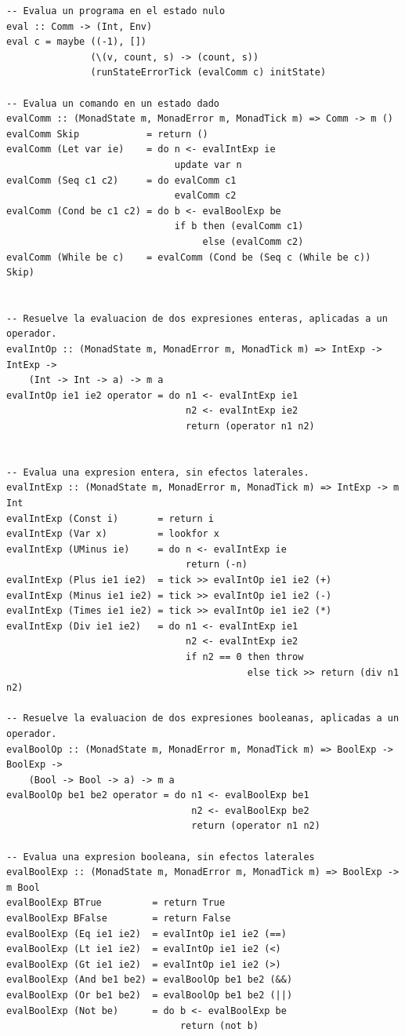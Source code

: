 \documentclass{article}
\begin{document}
\begin{lstlisting}
-- Evalua un programa en el estado nulo
eval :: Comm -> (Int, Env)
eval c = maybe ((-1), []) 
               (\(v, count, s) -> (count, s)) 
               (runStateErrorTick (evalComm c) initState)

-- Evalua un comando en un estado dado
evalComm :: (MonadState m, MonadError m, MonadTick m) => Comm -> m ()
evalComm Skip            = return ()
evalComm (Let var ie)    = do n <- evalIntExp ie 
                              update var n
evalComm (Seq c1 c2)     = do evalComm c1 
                              evalComm c2
evalComm (Cond be c1 c2) = do b <- evalBoolExp be 
                              if b then (evalComm c1)
                                   else (evalComm c2)
evalComm (While be c)    = evalComm (Cond be (Seq c (While be c)) Skip)


-- Resuelve la evaluacion de dos expresiones enteras, aplicadas a un operador.
evalIntOp :: (MonadState m, MonadError m, MonadTick m) => IntExp -> IntExp -> 
    (Int -> Int -> a) -> m a
evalIntOp ie1 ie2 operator = do n1 <- evalIntExp ie1
                                n2 <- evalIntExp ie2
                                return (operator n1 n2)


-- Evalua una expresion entera, sin efectos laterales.
evalIntExp :: (MonadState m, MonadError m, MonadTick m) => IntExp -> m Int
evalIntExp (Const i)       = return i
evalIntExp (Var x)         = lookfor x
evalIntExp (UMinus ie)     = do n <- evalIntExp ie 
                                return (-n)
evalIntExp (Plus ie1 ie2)  = tick >> evalIntOp ie1 ie2 (+)
evalIntExp (Minus ie1 ie2) = tick >> evalIntOp ie1 ie2 (-)
evalIntExp (Times ie1 ie2) = tick >> evalIntOp ie1 ie2 (*)
evalIntExp (Div ie1 ie2)   = do n1 <- evalIntExp ie1
                                n2 <- evalIntExp ie2
                                if n2 == 0 then throw
                                           else tick >> return (div n1 n2)

-- Resuelve la evaluacion de dos expresiones booleanas, aplicadas a un operador.
evalBoolOp :: (MonadState m, MonadError m, MonadTick m) => BoolExp -> BoolExp -> 
    (Bool -> Bool -> a) -> m a
evalBoolOp be1 be2 operator = do n1 <- evalBoolExp be1
                                 n2 <- evalBoolExp be2
                                 return (operator n1 n2)
                                 
-- Evalua una expresion booleana, sin efectos laterales
evalBoolExp :: (MonadState m, MonadError m, MonadTick m) => BoolExp -> m Bool
evalBoolExp BTrue         = return True
evalBoolExp BFalse        = return False
evalBoolExp (Eq ie1 ie2)  = evalIntOp ie1 ie2 (==)
evalBoolExp (Lt ie1 ie2)  = evalIntOp ie1 ie2 (<)
evalBoolExp (Gt ie1 ie2)  = evalIntOp ie1 ie2 (>)
evalBoolExp (And be1 be2) = evalBoolOp be1 be2 (&&)
evalBoolExp (Or be1 be2)  = evalBoolOp be1 be2 (||)
evalBoolExp (Not be)      = do b <- evalBoolExp be
                               return (not b)

\end{lstlisting}
\end{document}
